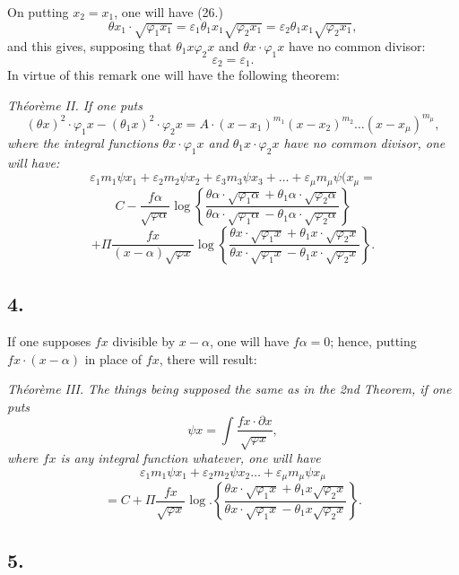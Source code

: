 \documentclass{article}
\begin{document}
On putting $x_2 = x_1$, one will have (26.)
\[ \theta x_1 \cdot \sqrt{\varphi_1 x_1} = \varepsilon_1\theta_1 x_1\sqrt{\varphi_2 x_1} = \varepsilon_2\theta_1 x_1\sqrt{\varphi_2 x_1}, \]
and this gives, supposing that $\theta_1 x\varphi_2 x$ and $\theta x \cdot \varphi_1 x$ have no common divisor:
\[ \varepsilon_2 = \varepsilon_1. \]
In virtue of this remark one will have the following theorem:

\emph{Théorème II. If one puts}
\[ (\theta x)^{2} \cdot \varphi_1 x-(\theta_1 x)^{2} \cdot \varphi_2 x = A \cdot (x-x_1)^{m_1}(x-x_2)^{m_2}\ldots(x-x_\mu)^{m_\mu}, \tag{27} \]
\emph{where the integral functions $\theta x \cdot \varphi_1 x$ and $\theta_1 x \cdot \varphi_2 x$ have no common divisor, one will have:}
\[ \varepsilon_1 m_1\psi x_1 + \varepsilon_2 m_2\psi x_2 + \varepsilon_3 m_3\psi x_3 + \ldots + \varepsilon_\mu m_\mu\psi(x_\mu = \tag{28} \]
\[ C - \frac{f\alpha}{\sqrt{\varphi\alpha}}\log\left\{\frac{\theta\alpha \cdot \sqrt{\varphi_1\alpha}+\theta_1\alpha \cdot \sqrt{\varphi_2\alpha}}{\theta\alpha \cdot \sqrt{\varphi_1\alpha}-\theta_1\alpha \cdot \sqrt{\varphi_2\alpha}}\right\} \]
\[ + \Pi\frac{fx}{(x-\alpha)\sqrt{\varphi x}}\log\left\{\frac{\theta x \cdot \sqrt{\varphi_1 x}+\theta_1 x \cdot \sqrt{\varphi_2 x}}{\theta x \cdot \sqrt{\varphi_1 x}-\theta_1 x \cdot \sqrt{\varphi_2 x}}\right\}. \]

\subsection*{4.}

If one supposes $fx$ divisible by $x-\alpha$, one will have $f\alpha = 0$; hence, putting $fx \cdot (x-\alpha)$ in place of $fx$, there will result:

\emph{Théorème III. The things being supposed the same as in the 2nd Theorem, if one puts}
\[ \psi x = \int \frac{fx \cdot \partial x}{\sqrt{\varphi x}}, \]
\emph{where $fx$ is any integral function whatever, one will have}
\[ \varepsilon_1 m_1\psi x_1 + \varepsilon_2 m_2\psi x_2 \ldots + \varepsilon_\mu m_\mu\psi x_\mu \tag{29} \]
\[ = C + \Pi\frac{fx}{\sqrt{\varphi x}}\log.\left\{\frac{\theta x \cdot \sqrt{\varphi_1 x}+\theta_1 x\sqrt{\varphi_2 x}}{\theta x \cdot \sqrt{\varphi_1 x}-\theta_1 x\sqrt{\varphi_2 x}}\right\}. \]

\subsection*{5.}
\end{document}
